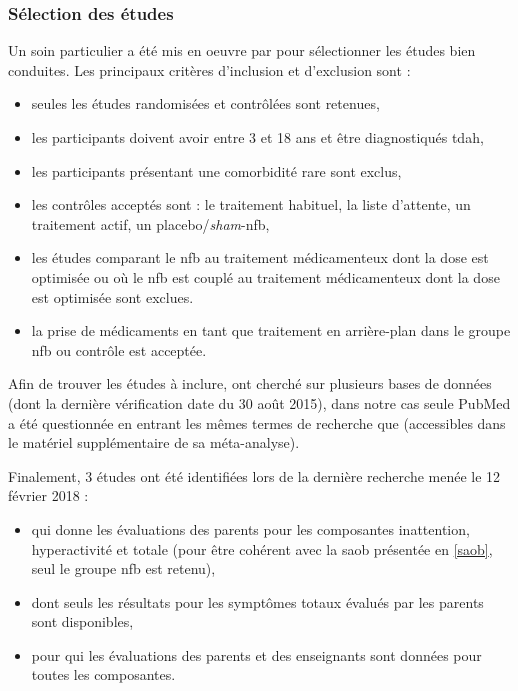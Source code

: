 \subsubsection{Sélection des études}
Un soin particulier a été mis en oeuvre par \citet{Cortese2016} pour sélectionner les études bien conduites. Les principaux critères d'inclusion
et d'exclusion sont \citep{Cortese2016} :
\begin{itemize}
\item seules les études randomisées et contrôlées sont retenues,
\item les participants doivent avoir entre 3 et 18 ans et être diagnostiqués \gls{tdah},
\item les participants présentant une comorbidité rare sont exclus,
\item les contrôles acceptés sont : le traitement habituel, la liste d'attente, un traitement actif, un placebo/\textit{sham}-\gls{nfb},
\item les études comparant le \gls{nfb} au traitement médicamenteux dont la dose est optimisée ou où le \gls{nfb} est couplé au traitement médicamenteux
dont la dose est optimisée sont exclues.
\item la prise de médicaments en tant que traitement en arrière-plan dans le groupe \gls{nfb} ou contrôle est acceptée.
\end{itemize}

Afin de trouver les études à inclure, \citet{Cortese2016} ont cherché sur plusieurs bases de données (dont la dernière vérification
date du 30 août 2015), dans notre cas seule PubMed a été questionnée en
entrant les mêmes termes de recherche que \citet{Cortese2016} (accessibles dans le matériel supplémentaire de sa méta-analyse).

Finalement, 3 études ont été identifiées lors de la dernière recherche menée le 12 février 2018 : 
\begin{itemize}
\item \citep{Bazanova2018} qui donne les évaluations des parents pour les composantes inattention, hyperactivité et totale (pour être cohérent avec 
la \gls{saob} présentée en \ref{saob}, seul le groupe \gls{nfb} est retenu),
\item \citep{Baumeister2016} dont seuls les résultats pour les symptômes totaux évalués par les parents sont disponibles,
\item \citep{Strehl2017} pour qui les évaluations des parents et des enseignants sont données pour toutes les composantes.
\end{itemize}


